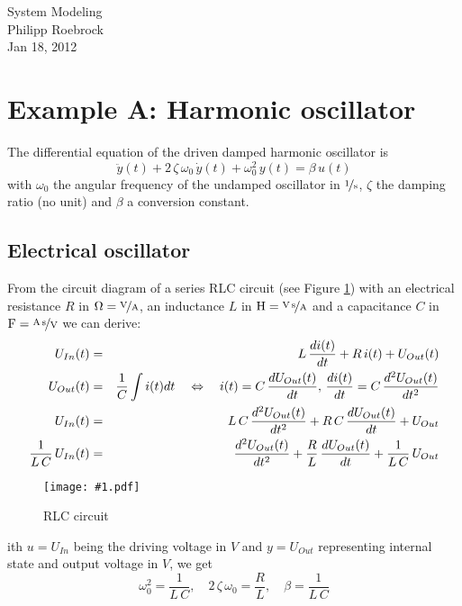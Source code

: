 \documentclass[a4paper,12pt]{article}
\newcommand{\Fig}[4]{%
\begin{figure}[htb]%
\begin{center}%
\texttt{[image: \#1.pdf]}%
\end{center}%
\caption{#3\label{fig:#1}}%
\end{figure}%
}
\newcommand{\FigRef}[1]{Figure \ref{fig:#1}}
\newcommand{\pfrac}[2]{\frac{#1}{#2}}
\newcommand{\Section}[2]{\section{#2}\label{section:#1}}
\newcommand{\SubSection}[2]{\subsection{#2}\label{subsection:#1}}
\begin{document}
\vspace{1.5cm}
\begin{center}
{\Huge System Modeling}\\[3ex]
Philipp Roebrock\\[1ex]
Jan 18, 2012\\
\end{center}
\vspace{1cm}



\Section{examplea}{Example A: Harmonic oscillator}

The differential equation of the driven damped harmonic oscillator is
\begin{equation}
\ddot{y}(t)+2\,\zeta\,\omega_0\,\dot{y}(t)+\omega_0^2\,y(t)=\beta\,u(t)
\end{equation}
with $\omega_0$ the angular frequency of the undamped oscillator in $\unitfrac{1}{s}$, $\zeta$ the damping ratio (no unit) and $\beta$ a conversion constant.\\

\SubSection{exampleaelec}{Electrical oscillator}

From the circuit diagram of a series RLC circuit (see \FigRef{elecoscil}) with an electrical resistance $R$ in $\unit{\Omega}=\unitfrac{V}{A}$, an inductance $L$ in $\unit{H}=\unitfrac{V\,s}{A}$ and a capacitance $C$ in $\unit{F}=\unitfrac{A\,s}{V}$ we can derive:
\begin{eqnarray}
U_{In}(t)&=&L\,{{di(t)}\over{dt}}+R\,i(t)+U_{Out}(t)\\
U_{Out}(t)&=&{1\over{C}}\int i(t)dt\quad\Leftrightarrow\quad i(t)=C\,{dU_{Out}(t)\over{dt}},\,{{di(t)}\over{dt}}=C\,{d^2U_{Out}(t)\over{dt^2}}\\
U_{In}(t)&=&L\,C\,{d^2U_{Out}(t)\over{dt^2}}+R\,C\,{dU_{Out}(t)\over{dt}}+U_{Out}\\
{1\over{L\,C}}\,U_{In}(t)&=&{d^2U_{Out}(t)\over{dt^2}}+{R\over{L}}\,{dU_{Out}(t)\over{dt}}+{1\over{L\,C}}\,U_{Out}\\
\end{eqnarray}

\Fig{elecoscil}{0.5}{RLC circuit}

With $u=U_{In}$ being the driving voltage in $\unit{V}$ and $y=U_{Out}$ representing internal state and output voltage in $\unit{V}$, we get
\begin{equation}
\omega_0^2=\pfrac{1}{L\,C},\quad2\,\zeta\,\omega_0=\pfrac{R}{L},\quad\beta=\pfrac{1}{L\,C}
\end{equation}
\end{document}

